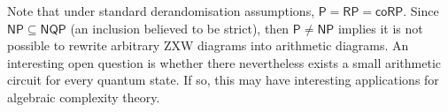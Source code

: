 Note that under standard derandomisation assumptions, $\mathsf{P} = \mathsf{RP} = \mathsf{coRP}$. Since $\mathsf{NP} \subseteq \mathsf{NQP}$ (an inclusion believed to be strict), then $\mathsf{P} \neq \mathsf{NP}$ implies it is not possible to rewrite arbitrary ZXW diagrams into arithmetic diagrams. An interesting open question is whether there nevertheless exists a small arithmetic circuit for every quantum state. If so, this may have interesting applications for algebraic complexity theory.